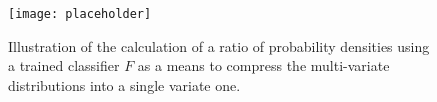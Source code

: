 \begin{figure}[t]
  \centering
  \texttt{[image: placeholder]}
  \caption{Illustration of the calculation of a ratio of probability densities
    using a trained classifier $F$ as a means to compress the multi-variate
    distributions into a single variate one.}
  \label{fig:nd-rw-illustration}
\end{figure}